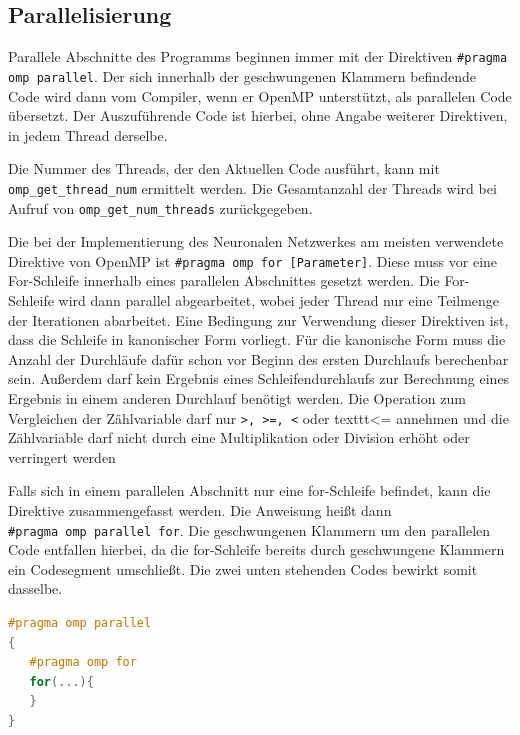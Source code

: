 \documentclass[../main.tex]{subfiles}
\begin{document}
\subsection{Parallelisierung}

Parallele Abschnitte des Programms beginnen immer mit der Direktiven \texttt{\#pragma omp parallel}. Der sich innerhalb der geschwungenen Klammern befindende Code wird dann vom Compiler, wenn er OpenMP unterstützt, als parallelen Code übersetzt. Der Auszuführende Code ist hierbei, ohne Angabe weiterer Direktiven, in jedem Thread derselbe. 

Die Nummer des Threads, der den Aktuellen Code ausführt, kann mit \linebreak \texttt{omp\_get\_thread\_num} ermittelt werden. Die Gesamtanzahl der Threads wird bei Aufruf von \texttt{omp\_get\_num\_threads} zurückgegeben.

Die bei der Implementierung des Neuronalen Netzwerkes am meisten verwendete Direktive von OpenMP ist \texttt{\#pragma omp for [Parameter]}. Diese muss vor eine For-Schleife innerhalb eines parallelen Abschnittes gesetzt werden. Die For-Schleife wird dann parallel abgearbeitet, wobei jeder Thread nur eine Teilmenge der Iterationen abarbeitet. Eine Bedingung zur Verwendung dieser Direktiven ist, dass die Schleife in kanonischer Form vorliegt. Für die kanonische Form muss die Anzahl der Durchläufe dafür schon vor Beginn des ersten Durchlaufs berechenbar sein. Außerdem darf kein Ergebnis eines Schleifendurchlaufs zur Berechnung eines Ergebnis in einem anderen Durchlauf benötigt werden. Die Operation zum Vergleichen der Zählvariable darf nur \texttt{>, >=, <} oder texttt{<=} annehmen und die Zählvariable darf nicht durch eine Multiplikation oder Division erhöht oder verringert werden

Falls sich in einem parallelen Abschnitt nur eine for-Schleife befindet, kann die Direktive zusammengefasst werden. Die Anweisung heißt dann \texttt{\#pragma\ omp\ parallel\ for}. Die geschwungenen Klammern um den parallelen Code entfallen hierbei, da die for-Schleife bereits durch geschwungene Klammern ein Codesegment umschließt. Die zwei unten stehenden Codes bewirkt somit dasselbe.

\begin{lstlisting}[language=c++, caption=For innerhalb eines parallelen Abschnitts, captionpos=b, label=listing:for_in_parallel, frame=single, linewidth=\textwidth, breaklines=true]
#pragma omp parallel
{
   #pragma omp for
   for(...){
   }
}
\end{lstlisting}
\end{document}
